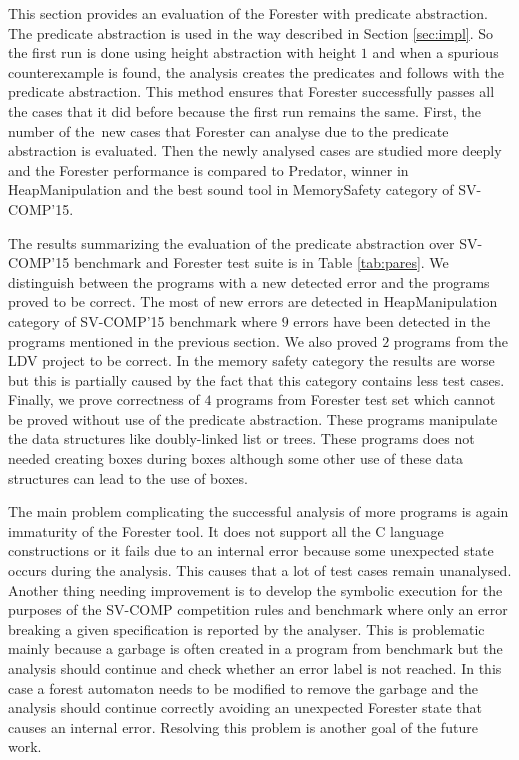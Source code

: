 This section provides an evaluation of the Forester with predicate abstraction.
The predicate abstraction is used in the way described in Section \ref{sec:impl}.
So the first run is done using height abstraction with height $1$ and when a spurious
counterexample is found, the analysis creates the predicates and follows with
the predicate abstraction.
This method ensures that Forester successfully passes all the cases that it did
before because the first run remains the same.
First, the number of the~new cases that Forester can analyse due to
the predicate abstraction is evaluated.
Then the newly analysed cases are studied more deeply and
the Forester performance is compared to Predator, winner in HeapManipulation
and the best sound tool in MemorySafety category of SV-COMP'15.

The results summarizing the evaluation of the predicate abstraction over SV-COMP'15
benchmark and Forester test suite is in Table \ref{tab:pares}.
We distinguish between the programs with a new detected error
and the programs proved to be correct.
The most of new errors are detected in HeapManipulation category of SV-COMP'15
benchmark where $9$ errors have been detected in the programs
mentioned in the previous section.
We also proved $2$ programs from the LDV project to be correct.
In the memory safety category the results are worse but this is partially caused
by the fact that this category contains less test cases.
Finally, we prove correctness of $4$ programs from Forester test set
which cannot be proved without use of the predicate abstraction.
These programs manipulate the data structures like doubly-linked list
or trees.
These programs does not needed creating boxes during boxes although
some other use of these data structures can lead to the use of boxes.

The main problem complicating the successful analysis of
more programs is again immaturity of the Forester tool.
It does not support all the C language constructions
or it fails due to an internal error because some unexpected
state occurs during the analysis.
This causes that a lot of test cases remain unanalysed.
Another thing needing improvement is to develop the symbolic
execution for the purposes of the SV-COMP competition rules and benchmark
where only an error breaking a given specification is reported
by the analyser.
This is problematic mainly because a garbage is often created
in a program from benchmark but the analysis should continue
and check whether an error label is not reached.
In this case a forest automaton needs to be modified
to remove the garbage and the analysis should continue correctly avoiding
an unexpected Forester state that causes an internal error.
Resolving this problem is another goal of the future work.

